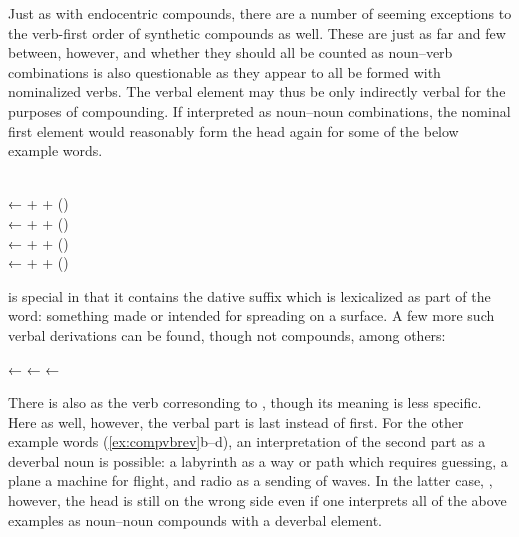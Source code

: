 Just as with endocentric compounds, there are a number of seeming exceptions to 
the verb-first order of synthetic compounds as well. These are just as far and 
few between, however, and whether they should all be counted as noun–verb 
combinations is also questionable as they appear to all be formed with 
nominalized verbs. The verbal element may thus be only indirectly verbal for 
the purposes of compounding. If interpreted as noun--noun combinations, the 
nominal first element would reasonably form the head again for some of the 
below example words.

\pex\label{ex:compvbrev}
	\a {} \\
		← 
		+ 
		+  (\Dat{})
	\a {} \\
		← 
		+ 
		+  (\Nmlz{})
	\a {} \\
		← 
		+ 
		+  (\Nmlz{})
	\a {} \\
		← 
		+ 
		+  (\Nmlz{})
\xe

 is special in that it contains the dative 
suffix  which is lexicalized as part of the word: something 
made or intended for spreading on a surface. A few more such verbal derivations 
can be found, though not compounds, among others:

\pex
	\a {}
		← 
	\a {}
		←  
	\a {}
		← 
\xe

There is also  as the verb corresonding 
to , though its meaning is less specific. Here 
as well, however, the verbal part is last instead of first. For the other 
example words (\ref{ex:compvbrev}b--d), an interpretation of the second part as 
a deverbal noun is possible: a labyrinth as a way or path which requires 
guessing, a plane a machine for flight, and radio as a sending of waves. In the 
latter case, , however, the head is still on the 
wrong side even if one interprets all of the above examples as noun--noun 
compounds with a deverbal element.

